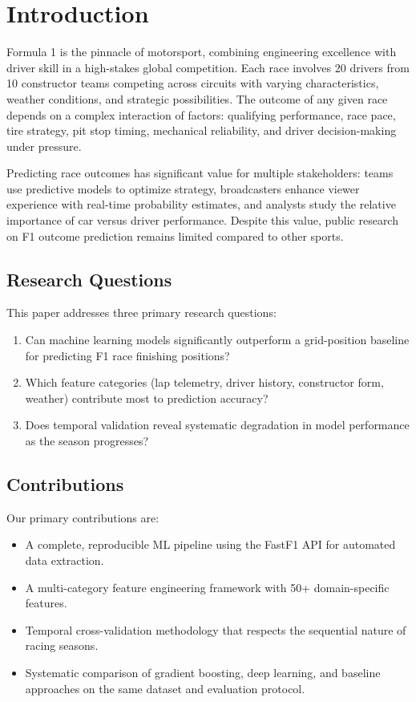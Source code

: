 \section{Introduction}

Formula 1 is the pinnacle of motorsport, combining engineering excellence with
driver skill in a high-stakes global competition. Each race involves 20 drivers
from 10 constructor teams competing across circuits with varying characteristics,
weather conditions, and strategic possibilities. The outcome of any given race
depends on a complex interaction of factors: qualifying performance, race pace,
tire strategy, pit stop timing, mechanical reliability, and driver decision-making
under pressure.

Predicting race outcomes has significant value for multiple stakeholders: teams
use predictive models to optimize strategy, broadcasters enhance viewer experience
with real-time probability estimates, and analysts study the relative importance
of car versus driver performance. Despite this value, public research on F1
outcome prediction remains limited compared to other sports.

\subsection{Research Questions}

This paper addresses three primary research questions:

\begin{enumerate}
    \item Can machine learning models significantly outperform a grid-position
          baseline for predicting F1 race finishing positions?
    \item Which feature categories (lap telemetry, driver history, constructor
          form, weather) contribute most to prediction accuracy?
    \item Does temporal validation reveal systematic degradation in model
          performance as the season progresses?
\end{enumerate}

\subsection{Contributions}

Our primary contributions are:
\begin{itemize}
    \item A complete, reproducible ML pipeline using the FastF1 API for
          automated data extraction.
    \item A multi-category feature engineering framework with 50+ domain-specific
          features.
    \item Temporal cross-validation methodology that respects the sequential nature
          of racing seasons.
    \item Systematic comparison of gradient boosting, deep learning, and baseline
          approaches on the same dataset and evaluation protocol.
\end{itemize}

